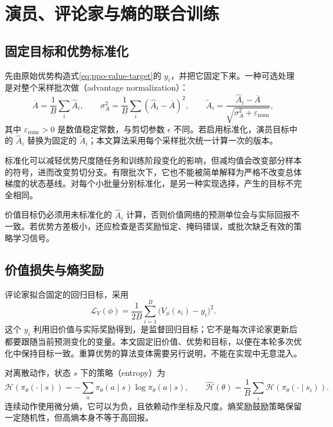 \documentclass[UTF8]{ctexart}
\begin{document}
\section{演员、评论家与熵的联合训练}
\label{sec:ppo-loss}

\subsection{固定目标和优势标准化}

先由原始优势构造式\eqref{eq:ppo-value-target}的 $y_i$，并把它固定下来。一种可选处理是对整个采样批次做（advantage normalization）：
\begin{equation}
  \overline A=\frac1B\sum_i\widehat A_i,\qquad
  \sigma_A^2=\frac1B\sum_i(\widehat A_i-\overline A)^2,\qquad
  \widetilde A_i=\frac{\widehat A_i-\overline A}
                      {\sqrt{\sigma_A^2+\varepsilon_{\mathrm{num}}}},
  \label{eq:ppo-advantage-normalization}
\end{equation}
其中 $\varepsilon_{\mathrm{num}}>0$ 是数值稳定常数，与剪切参数 $\epsilon$ 不同。若启用标准化，演员目标中的 $\widehat A_i$ 替换为固定的 $\widetilde A_i$；本文算法采用每个采样批次统一计算一次的版本。

标准化可以减轻优势尺度随任务和训练阶段变化的影响，但减均值会改变部分样本的符号，进而改变剪切分支。有限批次下，它也不能被简单解释为严格不改变总体梯度的状态基线。对每个小批量分别标准化，是另一种实现选择，产生的目标不完全相同。

价值目标仍必须用未标准化的 $\widehat A_i$ 计算，否则价值网络的预测单位会与实际回报不一致。若优势方差极小，还应检查是否奖励恒定、掩码错误，或批次缺乏有效的策略学习信号。

\subsection{价值损失与熵奖励}

评论家拟合固定的回归目标，采用
\begin{equation}
  \mathcal L_V(\phi)
  =\frac1{2B}\sum_{i=1}^B\bigl(V_\phi(s_i)-y_i\bigr)^2.
  \label{eq:ppo-value-loss}
\end{equation}
这个 $y_i$ 利用旧价值与实际奖励得到，是监督回归目标；它不是每次评论家更新后都要跟随当前预测变化的变量。本文固定旧价值、优势和目标，以便在本轮多次优化中保持目标一致。重算优势的算法变体需要另行说明，不能在实现中无意混入。

对离散动作，状态 $s$ 下的策略（entropy）为
\begin{equation}
  \mathcal H(\pi_\theta(\cdot\mid s))
  =-\sum_a\pi_\theta(a\mid s)\log\pi_\theta(a\mid s),
  \qquad
  \widehat{\mathcal H}(\theta)
  =\frac1B\sum_i\mathcal H(\pi_\theta(\cdot\mid s_i)).
  \label{eq:ppo-entropy}
\end{equation}
连续动作使用微分熵，它可以为负，且依赖动作坐标及尺度。熵奖励鼓励策略保留一定随机性，但高熵本身不等于高回报。
\end{document}
